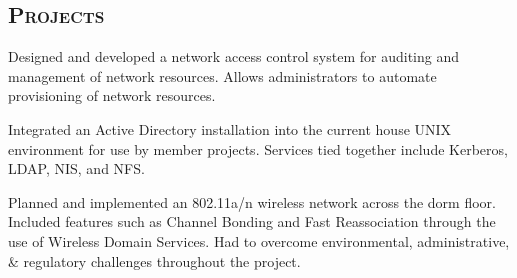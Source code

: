 \begin{resume}
\section{\textsc{Projects}}


\begin{position}
Designed and developed a network access control system for auditing and management of network resources. Allows administrators to automate provisioning of network resources.
\end{position}

\begin{position}
Integrated an Active Directory installation into the current house UNIX environment for use by member projects. Services tied together include Kerberos, LDAP, NIS, and NFS. 
\end{position}



\begin{position}
Planned and implemented an 802.11a/n wireless network across the dorm floor. Included features such as Channel Bonding and Fast Reassociation through the use of Wireless Domain Services. Had to overcome environmental, administrative, \& regulatory challenges throughout the project.
\end{position}


\end{resume}
